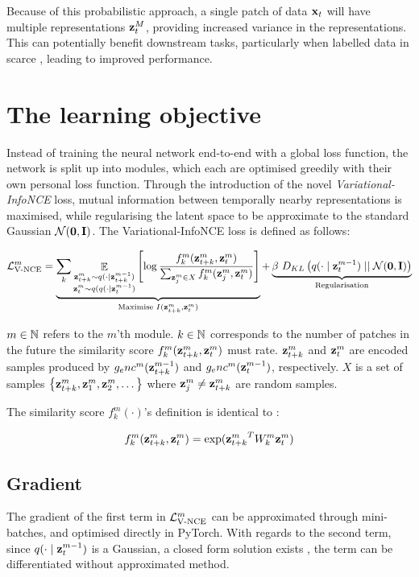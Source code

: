 			
		Because of this probabilistic approach, a single patch of data $\mathbf{x}_t$ will have multiple representations $\mathbf{z}_t^M$, providing increased variance in the representations. This can potentially benefit downstream tasks, particularly when labelled data in scarce \cite{weiRecentAdvancesVariational2021}, leading to improved performance. %
			

		
		
\section{The learning objective}
	Instead of training the neural network end-to-end with a global loss function, the network is split up into modules, which each are optimised greedily with their own personal loss function. Through the introduction of the novel \textit{Variational-InfoNCE} loss, mutual information between temporally nearby representations is maximised, while regularising the latent space to be approximate to the standard Gaussian $\mathcal{N}(\bm{\mathbf{0}}, \mathbf{I})$. The Variational-InfoNCE loss is defined as follows:
	
	\begin{equation} %
		\Lvnce^m =
		\underbrace{\reconstrgim}_{\text{Maximise } I(\ztk^m, \zt^m)} + \underbrace{\beta ~ \latentspaceconstraintgim}_{\text{Regularisation}}
		\label{eq:variational_gim_loss}
	\end{equation}

	$m \in \mathbb{N}$ refers to the $m$'th module. $k \in \mathbb{N}$ corresponds to the number of patches in the future the similarity score $f_k^m(\mathbf{z}_{t+k}^m,\mathbf{z}_t^m)$ must rate. $\mathbf{z}_{t+k}^m$ and $\mathbf{z}_t^m$ are encoded samples produced by $g_enc^m(\mathbf{z}_{t+k}^{m-1})$ and $g_enc^m(\mathbf{z}_t^{m-1})$, respectively. $X$ is a set of samples ${ \left\{ \mathbf{z}_{t+k}^m, \mathbf{z}_1^m, \mathbf{z}_2^m, \dots \right\} }$ where $\mathbf{z}_j^m \neq \mathbf{z}_{t+k}^m$ are random samples.


	The similarity score $f_k^m(\cdot)$'s definition is identical to \cite{lowePuttingEndEndtoEnd2020}:
	
	$$ f_k^m(\mathbf{z}_{t+k}^m,\mathbf{z}_t^m) = \exp({\mathbf{z}_{t+k}^m}^TW_k^m\mathbf{z}_t^m) $$

	\subsection{Gradient}
		The gradient of the first term in $\mathcal{L}_{\text{V-NCE}}^m$ can be approximated through mini-batches, and optimised directly in PyTorch. With regards to the second term, since $q(\cdot \mid \mathbf{z}_t^{m-1})$ is a Gaussian, a closed form solution exists \cite{kingmaAutoEncodingVariationalBayes2022}, the term can be differentiated without approximated method.
		
